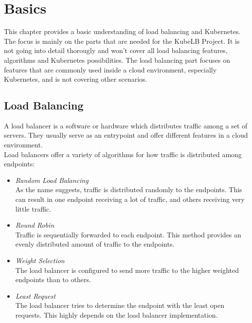 \chapter{Basics}\label{basics}

This chapter provides a basic understanding of load balancing and Kubernetes.
The focus is mainly on the parts that are needed for the KubeLB Project.
It is not going into detail thorougly and won't cover all load balancing features, algorithms and Kubernetes possibilities.
The load balancing part focuses on features that are commonly used inside a cloud environment, especially Kubernetes, and is not covering other scenarios.

\section{Load Balancing}

A load balancer is a software or hardware which distributes traffic among a set of servers.
They usually serve as an entrypoint and offer different features in a cloud environment.
\\
Load balancers offer a variety of algorithms for how traffic is distributed among endpoints:

\begin{itemize}\label{item:lb-algorithms}
    \item \textit{Random Load Balancing} \\
    As the name suggests, traffic is distributed randomly to the endpoints.
    This can result in one endpoint receiving a lot of traffic, and others receiving very little traffic.
    \item \textit{Round Robin} \\
    Traffic is sequentially forwarded to each endpoint.
    This method provides an evenly distributed amount of traffic to the endpoints.
    \item \textit{Weight Selection} \\
    The load balancer is configured to send more traffic to the higher weighted endpoints than to others.
    \item \textit{Least Request} \\
    The load balancer tries to determine the endpoint with the least open requests.
    This highly depends on the load balancer implementation.
\end{itemize}

